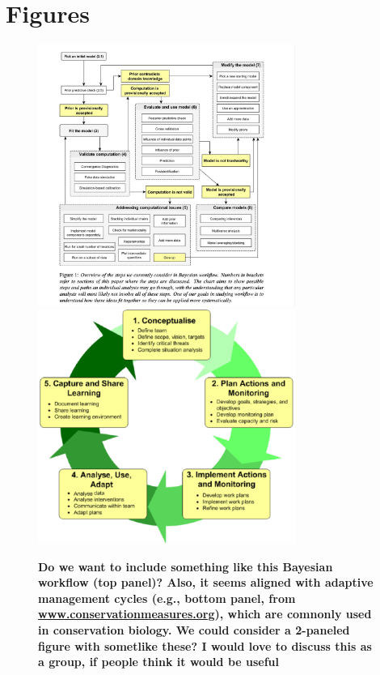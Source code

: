 \documentclass{article}
\begin{document}


\section* {Figures}
 \begin{figure}[h]
\centering
 \includegraphics[width=0.75\textwidth]{../figs/BayesianWorkflowfromGelman2020.jpg}
  \includegraphics[width=0.75\textwidth]{../figs/The-Open-Standards-adaptive-management-cycle-from-wwwconservationmeasuresorg.png}
 \caption{\textbf{Do we want to include something like this Bayesian workflow \citep{gelman2020bayesian} (top panel)? Also, it seems aligned with adaptive management cycles (e.g., bottom panel, from \href{www.conservationmeasures.org}{www.conservationmeasures.org}), which are comnonly used in conservation biology. We could consider a 2-paneled figure with sometlike these? I would love to discuss this as a group, if people think it would be useful}} 
 \label{fig:workflow}
 \end{figure}
\end{document}
